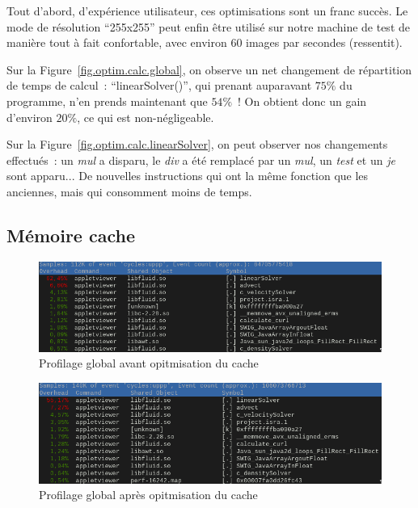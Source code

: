\documentclass[12pt,a4paper]{article}
\begin{document}
Tout d’abord, d’expérience utilisateur, ces optimisations sont un franc succès.
Le mode de résolution \enquote{255x255} peut enfin être utilisé sur
notre machine de test de manière tout à fait confortable, avec environ 60 images
par secondes (ressentit).

Sur la Figure~\ref{fig.optim.calc.global}, on observe un net changement de
répartition de temps de calcul : \enquote{linearSolver()}, qui prenant
auparavant $75\%$ du programme, n’en prends maintenant que $54\%$ ! On obtient
donc un gain d’environ $20\%$, ce qui est non-négligeable.

Sur la Figure~\ref{fig.optim.calc.linearSolver}, on peut observer nos
changements effectués : un \textit{mul} a disparu, le \textit{div} a été
remplacé par un \textit{mul}, un \textit{test} et un \textit{je} sont apparu...
De nouvelles instructions qui ont la même fonction que les anciennes, mais qui
consomment moins de temps.

\subsection{Mémoire cache}
\label{sub.optim.cache}

\begin{figure}
    \centering
    \includegraphics[scale=0.50]{figures/optims/cache/global-before.png}
    \caption{Profilage global avant opitmisation du cache}
    \label{fig.optim.cache.before}
\end{figure}

\begin{figure}
    \centering
    \includegraphics[scale=0.55]{figures/optims/cache/global-after.png}
    \caption{Profilage global après opitmisation du cache}
    \label{fig.optim.cache.after}
\end{figure}
\end{document}
